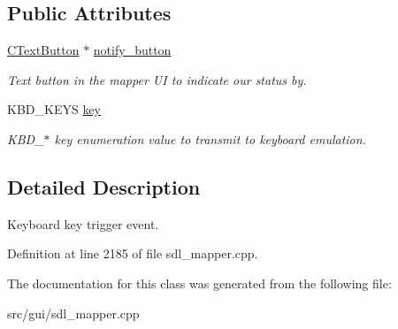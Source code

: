 \subsection*{Public Attributes}
\begin{DoxyCompactItemize}
\item 
\hypertarget{classCKeyEvent_a93407353bb472fc93fa7962f1c2e7933}{\hyperlink{classCTextButton}{C\-Text\-Button} $\ast$ \hyperlink{classCKeyEvent_a93407353bb472fc93fa7962f1c2e7933}{notify\-\_\-button}}\label{classCKeyEvent_a93407353bb472fc93fa7962f1c2e7933}

\begin{DoxyCompactList}\small\item\em Text button in the mapper U\-I to indicate our status by. \end{DoxyCompactList}\item 
\hypertarget{classCKeyEvent_aa5d774b3b526c036d79dbf87ba437afd}{K\-B\-D\-\_\-\-K\-E\-Y\-S \hyperlink{classCKeyEvent_aa5d774b3b526c036d79dbf87ba437afd}{key}}\label{classCKeyEvent_aa5d774b3b526c036d79dbf87ba437afd}

\begin{DoxyCompactList}\small\item\em K\-B\-D\-\_\-$\ast$ key enumeration value to transmit to keyboard emulation. \end{DoxyCompactList}\end{DoxyCompactItemize}


\subsection{Detailed Description}
Keyboard key trigger event. 

Definition at line 2185 of file sdl\-\_\-mapper.\-cpp.



The documentation for this class was generated from the following file\-:\begin{DoxyCompactItemize}
\item 
src/gui/sdl\-\_\-mapper.\-cpp\end{DoxyCompactItemize}
